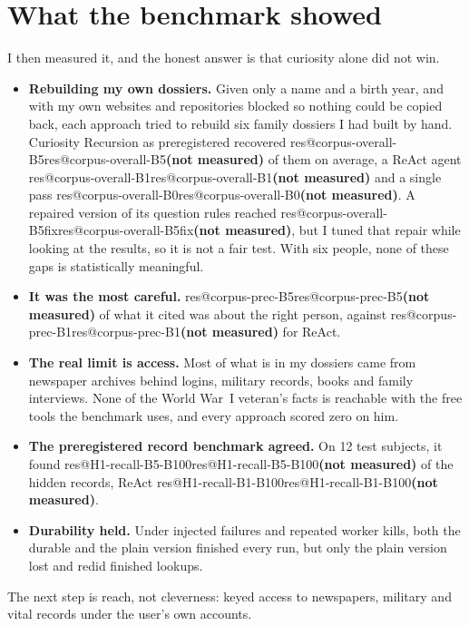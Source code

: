 \documentclass[11pt]{article}
\makeatletter
\newcommand{\RESULT}[1]{\ifcsname res@#1\endcsname\csname res@#1\endcsname\else\textbf{(not measured)}\fi}
\makeatother
\begin{document}
\section*{What the benchmark showed}
I then measured it, and the honest answer is that curiosity alone did not win.
\begin{itemize}
\item \textbf{Rebuilding my own dossiers.} Given only a name and a birth year, and with my own websites and repositories blocked so nothing could be copied back, each approach tried to rebuild six family dossiers I had built by hand. Curiosity Recursion as preregistered recovered \RESULT{corpus-overall-B5} of them on average, a ReAct agent \RESULT{corpus-overall-B1} and a single pass \RESULT{corpus-overall-B0}. A repaired version of its question rules reached \RESULT{corpus-overall-B5fix}, but I tuned that repair while looking at the results, so it is not a fair test. With six people, none of these gaps is statistically meaningful.
\item \textbf{It was the most careful.} \RESULT{corpus-prec-B5} of what it cited was about the right person, against \RESULT{corpus-prec-B1} for ReAct.
\item \textbf{The real limit is access.} Most of what is in my dossiers came from newspaper archives behind logins, military records, books and family interviews. None of the World War~I veteran's facts is reachable with the free tools the benchmark uses, and every approach scored zero on him.
\item \textbf{The preregistered record benchmark agreed.} On 12 test subjects, it found \RESULT{H1-recall-B5-B100} of the hidden records, ReAct \RESULT{H1-recall-B1-B100}.
\item \textbf{Durability held.} Under injected failures and repeated worker kills, both the durable and the plain version finished every run, but only the plain version lost and redid finished lookups.
\end{itemize}
The next step is reach, not cleverness: keyed access to newspapers, military and vital records under the user's own accounts.
\end{document}
